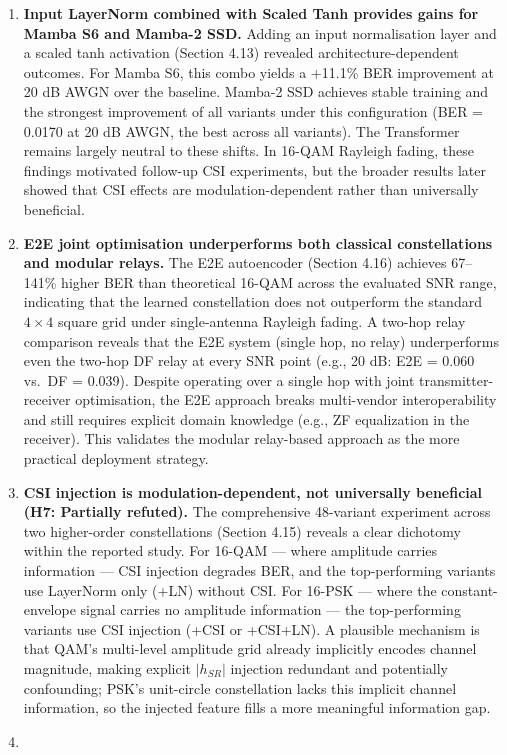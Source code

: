 \begin{enumerate}
\item
  \textbf{Input LayerNorm combined with Scaled Tanh provides gains for Mamba S6 and Mamba-2 SSD.} Adding an input normalisation layer and a scaled tanh activation (Section 4.13) revealed architecture-dependent outcomes. For Mamba S6, this combo yields a +11.1\% BER improvement at 20 dB AWGN over the baseline. Mamba-2 SSD achieves stable training and the strongest improvement of all variants under this configuration (BER = 0.0170 at 20 dB AWGN, the best across all variants). The Transformer remains largely neutral to these shifts. In 16-QAM Rayleigh fading, these findings motivated follow-up CSI experiments, but the broader results later showed that CSI effects are modulation-dependent rather than universally beneficial.
\item
  \textbf{E2E joint optimisation underperforms both classical constellations and modular relays.} The E2E autoencoder (Section 4.16) achieves 67--141\% higher BER than theoretical 16-QAM across the evaluated SNR range, indicating that the learned constellation does not outperform the standard \(4 \times 4\) square grid under single-antenna Rayleigh fading. A two-hop relay comparison reveals that the E2E system (single hop, no relay) underperforms even the two-hop DF relay at every SNR point (e.g., 20 dB: E2E = 0.060 vs.~DF = 0.039). Despite operating over a single hop with joint transmitter-receiver optimisation, the E2E approach breaks multi-vendor interoperability and still requires explicit domain knowledge (e.g., ZF equalization in the receiver). This validates the modular relay-based approach as the more practical deployment strategy.
\item
  \textbf{CSI injection is modulation-dependent, not universally beneficial (H7: Partially refuted).} The comprehensive 48-variant experiment across two higher-order constellations (Section 4.15) reveals a clear dichotomy within the reported study. For 16-QAM --- where amplitude carries information --- CSI injection degrades BER, and the top-performing variants use LayerNorm only (+LN) without CSI. For 16-PSK --- where the constant-envelope signal carries no amplitude information --- the top-performing variants use CSI injection (+CSI or +CSI+LN). A plausible mechanism is that QAM's multi-level amplitude grid already implicitly encodes channel magnitude, making explicit \(|h_{SR}|\) injection redundant and potentially confounding; PSK's unit-circle constellation lacks this implicit channel information, so the injected feature fills a more meaningful information gap.
\item

\end{enumerate}
